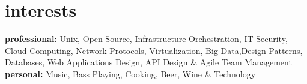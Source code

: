 \documentclass[]{friggeri-cv} %
\begin{document}
\section{interests}

\textbf{professional:} Unix, Open Source, Infrastructure Orchestration, IT Security, Cloud Computing, Network Protocols, Virtualization, Big Data,Design Patterns, Databases, Web Applications Design, API Design \& Agile Team Management \\ 
\textbf{personal:} Music, Bass Playing, Cooking, Beer, Wine \& Technology 
\end{document}
